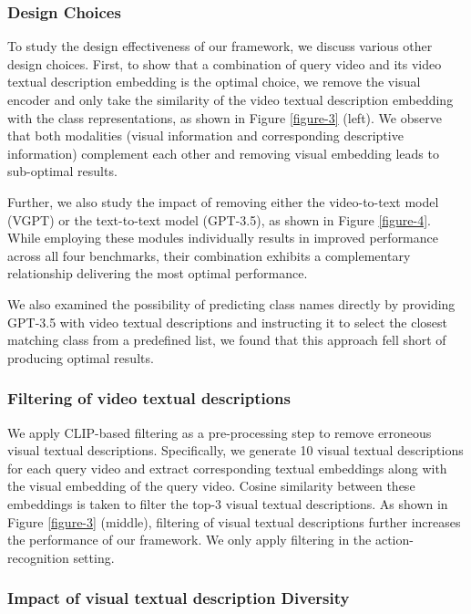 \documentclass{article} \usepackage{iclr2024_conference,times}
\begin{document}
\subsubsection{Design Choices}
To study the design effectiveness of our framework, we discuss various other design choices. First, to show that a combination of query video and its video textual description embedding is the optimal choice, we remove the visual encoder and only take the similarity of the video textual description embedding with the class representations, as shown in Figure \ref{figure-3} (left). We observe that both modalities (visual information and corresponding descriptive information) complement each other and removing visual embedding leads to sub-optimal results.

Further, we also study the impact of removing either the video-to-text model (VGPT) or the text-to-text model (GPT-3.5), as shown in Figure \ref{figure-4}. While employing these modules individually results in improved performance across all four benchmarks, their combination exhibits a complementary relationship delivering the most optimal performance. 

We also examined the possibility of predicting class names directly by providing GPT-3.5 with video textual descriptions and instructing it to select the closest matching class from a predefined list, we found that this approach fell short of producing optimal results. 

\subsubsection{Filtering of video textual descriptions}
\label{subsubsec:Filtering of Visual descriptions}
We apply CLIP-based filtering as a pre-processing step to remove erroneous visual textual descriptions.  Specifically, we generate 10 visual textual descriptions for each query video and extract corresponding textual embeddings along with the visual embedding of the query video. Cosine similarity between these embeddings is taken to filter the top-3  visual textual descriptions. As shown in Figure \ref{figure-3} (middle), filtering of visual textual descriptions further increases the performance of our framework. We only apply filtering in the action-recognition setting.


\subsubsection{Impact of visual textual description Diversity}
\end{document}
